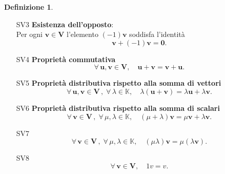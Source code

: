 \documentclass{article}
\theoremstyle{plain}
\theoremstyle{definition}
\newtheorem{defn}{Definizione}[section]
\theoremstyle{remark}
\begin{document}
\begin{bxthm}
\begin{defn}
\begin{itemize}
\begin{itemize}
            \item[SV3] \textbf{Esistenza dell'opposto}:\\
            Per ogni \( \mathbf{v} \in \mathbf{V} \) l'elemento \( (-1) \mathbf{v} \) soddisfa l'identità
            \[ \mathbf{v} + (-1) \mathbf{v} = \mathbf{0}. \]
            
            \item[SV4] \textbf{Proprietà commutativa}
            \[\forall\,\mathbf{u},\mathbf{v}\in \mathbf{V},\quad \mathbf{u} + \mathbf{v} = \mathbf{v} + \mathbf{u}. \]
            
            \item[SV5] \textbf{Proprietà distributiva rispetto alla somma di vettori}
            \[\forall\,\mathbf{u},\mathbf{v}\in \mathbf{V}\,,\;\forall\,\lambda\in\mathbb{K},\quad \lambda(\mathbf{u} + \mathbf{v}) = \lambda\mathbf{u} + \lambda\mathbf{v}. \]
            
            \item[SV6] \textbf{Proprietà distributiva rispetto alla somma di scalari}
            \[\forall\,\mathbf{v}\in \mathbf{V}\,,\;\forall\,\mu,\lambda\in\mathbb{K},\quad (\mu + \lambda)\mathbf{v} = \mu\mathbf{v} + \lambda\mathbf{v}. \]
            
            \item[SV7]
            \[\forall\,\mathbf{v}\in \mathbf{V}\,,\;\forall\,\mu,\lambda\in\mathbb{K},\quad (\mu\lambda)\mathbf{v} = \mu(\lambda\mathbf{v}).\]
            
            \item[SV8]
            \[ \forall\,\mathbf{v}\in \mathbf{V},\quad 1v = v. \]
        \end{itemize}
    \end{itemize}
\end{defn}
\end{bxthm}

\vspace{10pt}
\end{document}
